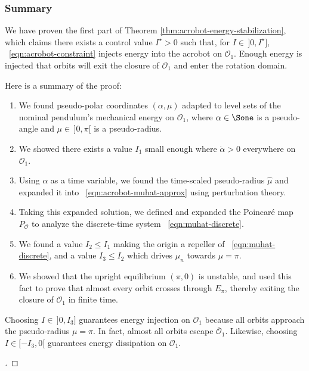 \subsubsection*{Summary}

We have proven the first part of Theorem \ref{thm:acrobot-energy-stabilization},
which claims there exists a control value \(I^\star > 0\) such that, for 
\(I \in \, ]0,I^\star]\), ~\eqref{eqn:acrobot-constraint} injects energy into
the acrobot on \(\mathcal{O}_1\).
Enough energy is injected that orbits will exit the closure of \(\mathcal{O}_1\)
and enter the rotation domain.

Here is a summary of the proof:
\begin{enumerate}
    \item We found pseudo-polar coordinates \((\alpha,\mu)\) adapted to level
        sets of the nominal pendulum's mechanical energy on \(\mathcal{O}_1\),
        where \(\alpha \in \Sone\) is a pseudo-angle and \(\mu \in \, ]0,\pi[\)
        is a pseudo-radius.
    \item We showed there exists a value \(I_1\) small enough where 
        \(\dot{\alpha} > 0\) everywhere on \(\mathcal{O}_1\).
    \item Using \(\alpha\) as a time variable, we found the time-scaled
        pseudo-radius \(\hat{\mu}\) and expanded it into
        ~\eqref{eqn:acrobot-muhat-approx} using perturbation theory.
    \item Taking this expanded solution, we defined and expanded the
        Poincar\'{e} map \(P_\mathcal{O}\) to analyze the discrete-time system
        ~\eqref{eqn:muhat-discrete}.
    \item We found a value \(I_2 \leq I_1\) making the origin a repeller of 
        ~\eqref{eqn:muhat-discrete}, and a value \(I_3 \leq I_2\) which drives
        \(\mu_n\) towards \(\mu = \pi\).
    \item We showed that the upright equilibrium \((\pi,0)\) is unstable, and
        used this fact to prove that almost every orbit crosses through
        \(E_\pi\), thereby exiting the closure of \(\mathcal{O}_1\) in finite
        time.
\end{enumerate}
Choosing \(I \in \,]0,I_3]\) guarantees energy injection on
\(\mathcal{O}_1\) because all orbits approach the pseudo-radius \(\mu = \pi\).
In fact, almost all orbits escape \(\bar{\mathcal{O}}_1\).
Likewise, choosing \(I \in [-I_3,0[\) guarantees energy dissipation on
\(\mathcal{O}_1\).

\begin{proof}[\unskip\nopunct]
\end{proof}

